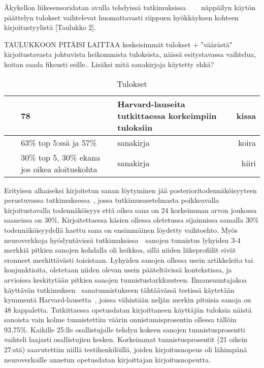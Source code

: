\documentclass[finnish]{tktltiki2}
\theoremstyle{definition}
\theoremstyle{remark}
\begin{document}
Äkykellon liikesensoridatan avulla tehdyissä tutkimuksissa~\cite{maiti} ~\cite{liu}~\cite{mole} näppäilyn käytön päättelyn tulokset vaihtelevat huomattavasti riippuen hyökkäyksen kohteen kirjoitustyylistä [Taulukko 2]. 

TAULUKKOON PITÄISI LAITTAA keskeisimmät tulokset + "väärästä" kirjoitustavasta johtuvista heikommista tuloksista, näissä esitystavassa vaihtelua, koitan saada fiksusti esille.. Lisäksi mitä sanakirjoja käytetty ehkä? 
\begin{table} [h]
    \begin{tabular}{ l | p{30mm} | p{30mm} | r | }
      ~\cite{maiti} & 78 & Harvard-lauseita tutkittaessa korkeimpiin tuloksiin & kissa \\
      \midrule
      ~\cite{liu} & 63\% top 5:ssä ja 57\%  & sanakirja & koira \\
      \midrule
      ~\cite{mole} & 30\% top 5, 30\% ekana jos oikea aloituskohta & sanakirja & hiiri \\
    \end{tabular}
    \caption{Tulokset}\label{t:2}
\end{table}
    

Erityisen alhaiseksi kirjoitetun sanan löytyminen jää posterioritodennäköisyyteen perustuvassa tutkimuksessa~\cite{mole}, jossa tutkimusasetelmasta poikkeavalla kirjoitustavalla todennäköisyys että oikea sana on 24 korkeimman arvon joukossa saaneissa on 30\%. Kirjoitettaessa käsien ollessa oletetussa sijainnissa samalla 30\% todennäköisyydellä haettu sana on ensimmäinen löydetty vaihtoehto. Myös neuroverkkoja hyödyntävissä tutkimuksissa~\cite{maiti}~\cite{liu}sanojen tunnistus lyhyiden 3-4 merkkiä pitkien sanojen kohdalla oli heikkoa, sillä niiden liikeprofiilit eivät eronneet merkittävästi toisistaan. Lyhyiden sanojen ollessa usein artikkeleita tai konjunktioita, oletetaan niiden olevan usein pääteltävissä kontekstissa, ja arvioissa keskitytään pitkien sanojen tunnistustarkkuuteen. Ilmansuuntajakoa käyttävän tutkimuksen~\cite{maiti} sanatunnistukseen tähtäävässä testissä käytetään kymmentä Harvard-lausetta~\cite{har}, joissa vähintään neljän merkin pituisia sanoja on 48 kappaletta. Tutkittaessa opetusdatan kirjoittaneen käyttäjän tuloksia näistä sanoista vain kolme tunnistettiin väärin onnistumisprosentin ollessa tällöin 93,75\%. Kaikille 25:lle osallistujalle tehdyn kokeen sanojen tunnistusprosentti vaihteli laajasti osallistujien kesken. Korkeimmat tunnistusprosentit (21 oikein 27:stä) saavutettiin niillä testihenkilöillä, joiden kirjoitusnopeus oli lähimpänä neuroverkoille annetun opetusdatan kirjoittajan kirjoitusnopeutta. 
\end{document}
